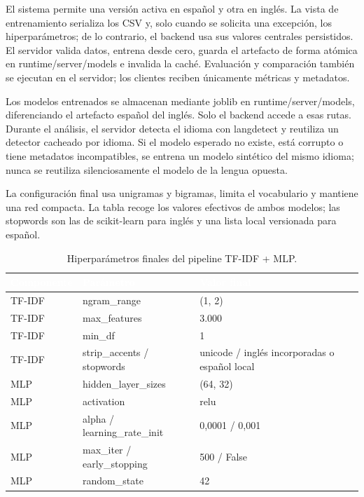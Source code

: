 \documentclass[11pt,a4paper,oneside]{report}
\begin{document}
El sistema permite una versión activa en español y otra en inglés. La vista de entrenamiento serializa los CSV y, solo cuando se solicita una excepción, los hiperparámetros; de lo contrario, el backend usa sus valores centrales persistidos. El servidor valida datos, entrena desde cero, guarda el artefacto de forma atómica en runtime/server/models e invalida la caché. Evaluación y comparación también se ejecutan en el servidor; los clientes reciben únicamente métricas y metadatos.

Los modelos entrenados se almacenan mediante joblib en runtime/server/models, diferenciando el artefacto español del inglés. Solo el backend accede a esas rutas. Durante el análisis, el servidor detecta el idioma con langdetect y reutiliza un detector cacheado por idioma. Si el modelo esperado no existe, está corrupto o tiene metadatos incompatibles, se entrena un modelo sintético del mismo idioma; nunca se reutiliza silenciosamente el modelo de la lengua opuesta.

La configuración final usa unigramas y bigramas, limita el vocabulario y mantiene una red compacta. La tabla recoge los valores efectivos de ambos modelos; las stopwords son las de scikit-learn para inglés y una lista local versionada para español.

\begingroup
\begin{table}[H]
  \centering
  \small
  \caption{Hiperparámetros finales del pipeline TF-IDF + MLP.}
  \label{tab:5-3}
  \begin{tabularx}{\textwidth}{|X|X|X|}
    \hline
    \rowcolor{uemcgreen}
    \textcolor{white}{\textbf{Componente}} & \textcolor{white}{\textbf{Parámetro}} & \textcolor{white}{\textbf{Valor final}} \\
    \hline
    TF-IDF & ngram\_range & (1, 2) \\
    \hline
    \rowcolor{tablelight}
    TF-IDF & max\_features & 3.000 \\
    \hline
    TF-IDF & min\_df & 1 \\
    \hline
    \rowcolor{tablelight}
    TF-IDF & strip\_accents / stopwords & unicode / inglés incorporadas o español local \\
    \hline
    MLP & hidden\_layer\_sizes & (64, 32) \\
    \hline
    \rowcolor{tablelight}
    MLP & activation & relu \\
    \hline
    MLP & alpha / learning\_rate\_init & 0,0001 / 0,001 \\
    \hline
    \rowcolor{tablelight}
    MLP & max\_iter / early\_stopping & 500 / False \\
    \hline
    MLP & random\_state & 42 \\
    \hline
  \end{tabularx}
\end{table}
\endgroup
\end{document}
